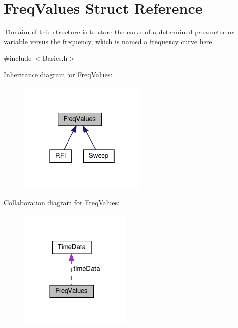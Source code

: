 \hypertarget{structFreqValues}{}\section{Freq\+Values Struct Reference}
\label{structFreqValues}


The aim of this structure is to store the curve of a determined parameter or variable versus the frequency, which is named a frequency curve here.  




{\ttfamily \#include $<$Basics.\+h$>$}



Inheritance diagram for Freq\+Values\+:\nopagebreak
\begin{figure}[H]
\begin{center}
\leavevmode
\includegraphics[width=178pt]{structFreqValues__inherit__graph}
\end{center}
\end{figure}


Collaboration diagram for Freq\+Values\+:\nopagebreak
\begin{figure}[H]
\begin{center}
\leavevmode
\includegraphics[width=156pt]{structFreqValues__coll__graph}
\end{center}
\end{figure}
